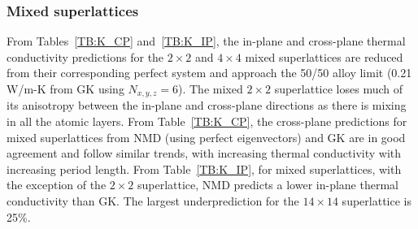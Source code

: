\documentclass[aps,prb,preprint,preprintnumbers,amsmath,amssymb,floatfix,superscriptaddress]{revtex4}
\begin{document}
\subsubsection{Mixed superlattices}
From Tables~\ref{TB:K_CP} and~\ref{TB:K_IP}, the in-plane and cross-plane thermal conductivity predictions for the $2\times 2$ and $4\times 4$ mixed superlattices are reduced from their corresponding perfect system and approach the 50/50 alloy limit (0.21 W/m-K from GK using $N_{x,y,z}=6$). The mixed $2\times 2$ superlattice loses much of its anisotropy between the in-plane and cross-plane directions as there is mixing in all the atomic layers. From Table~\ref{TB:K_CP}, the cross-plane predictions for mixed superlattices from NMD (using perfect eigenvectors) and GK are in good agreement and follow similar trends, with increasing thermal conductivity with increasing period length. From Table~\ref{TB:K_IP}, for mixed superlattices, with the exception of  the $2 \times 2$ superlattice, NMD predicts a lower in-plane thermal conductivity than GK. The largest underprediction for the $14 \times 14$ superlattice is 25\%.
\end{document}

